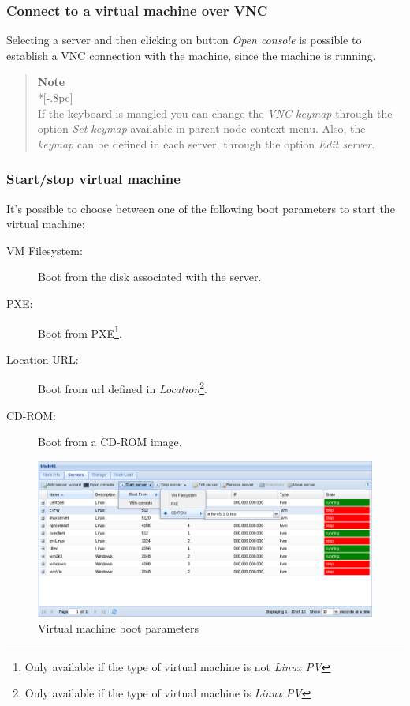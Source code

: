 \subsubsection{Connect to a virtual machine over VNC}
\label{sec:open_vnc}

Selecting a server and then clicking on button \emph{Open console} is possible to establish a VNC connection with the machine, since the machine is running.

\begin{quote}
	{\large \bf Note} \\*[-.8pc]
	\underline{\hspace{6in}} \\
    If the keyboard is mangled you can change the \emph{VNC keymap} through the option \emph{Set keymap} available in parent node context menu.
    Also, the \emph{keymap} can be defined in each server, through the option \emph{Edit server}.
\end{quote}

\subsubsection{Start/stop virtual machine}
\label{sec:start_server}

It's possible to choose between one of the following boot parameters to start the virtual machine:
\begin{description}
    \item[VM Filesystem:] Boot from the disk associated with the server.
    \item[PXE:] Boot from PXE\footnote{Only available if the type of virtual machine is not \emph{Linux PV}\label{foot:notpv}}.
    \item[Location URL:] Boot from url defined in \emph{Location}\footnote{Only available if the type of virtual machine is \emph{Linux PV}}.
	\item[CD-ROM:] Boot from a CD-ROM image.
    	 
\end{description}

\begin{figure}[H]
	\begin{center}
	\includegraphics[scale=0.45]{screenshots/server_start.png}
	\caption{Virtual machine boot parameters}
	\label{fig:server_start}
	\end{center}
\end{figure}

